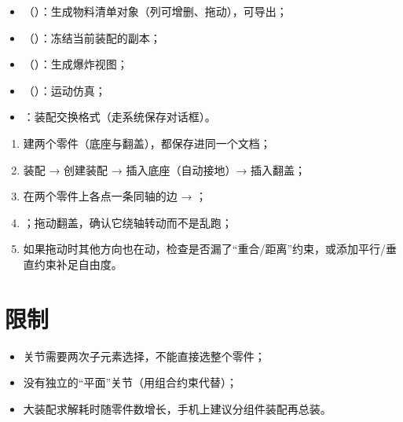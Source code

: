 \begin{itemize}
  \item {}（）：生成物料清单对象（列可增删、拖动），可导出；
  \item {}（）：冻结当前装配的副本；
  \item {}（）：生成爆炸视图；
  \item {}（）：运动仿真；
  \item {}：装配交换格式（走系统保存对话框）。
\end{itemize}

\begin{practice}[练习：做一个铰链]
\begin{enumerate}
  \item 建两个零件（底座与翻盖），都保存进同一个文档；
  \item 装配 → 创建装配 → 插入底座（自动接地）→ 插入翻盖；
  \item 在两个零件上各点一条同轴的边 → ；
  \item {}；拖动翻盖，确认它绕轴转动而不是乱跑；
  \item 如果拖动时其他方向也在动，检查是否漏了“重合/距离”约束，或添加平行/垂直约束补足自由度。
\end{enumerate}
\end{practice}

\section{限制}

\begin{itemize}
  \item 关节需要两次子元素选择，不能直接选整个零件；
  \item 没有独立的“平面”关节（用组合约束代替）；
  \item 大装配求解耗时随零件数增长，手机上建议分组件装配再总装。
\end{itemize}
